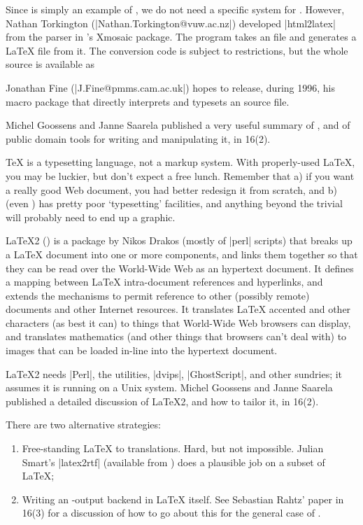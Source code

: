 Since  is simply an example of , we do not need a specific
system for .  However, Nathan Torkington
(\Email|Nathan.Torkington@vuw.ac.nz|) developed
\ProgName|html2latex| from the  parser in 's
Xmosaic package.
The program takes an  file and generates a \LaTeX{} file from it.
The conversion code is subject to  restrictions, but the whole
source is available as 

Jonathan Fine (\Email|J.Fine@pmms.cam.ac.uk|) hopes to release, during
1996, his macro package that directly interprets and typesets an
 source file.

Michel Goossens and Janne Saarela published a very useful summary of
, and of public domain tools for writing and manipulating it, in
\TUGboat{} 16(2).


\TeX{} is a typesetting language, not a markup system.
With properly-used \LaTeX{}, you may  be luckier, 
but don't expect a free lunch. Remember that a) if you want a really
good Web document, you had better redesign it from scratch, and b)  
(even ) has pretty poor `typesetting' facilities, and anything
beyond the trivial will probably need to end up a graphic.

\LaTeX{}2 () is a package by Nikos Drakos
(mostly of \ProgName|perl| scripts) that breaks up a \LaTeX{} document
into one or more components, and links them together so that they can
be read over the World-Wide Web as an hypertext document.
It defines a mapping between \LaTeX{} intra-document
references and hyperlinks, and extends the
mechanisms to permit reference to other (possibly remote) documents
and other Internet resources.  It translates \LaTeX{} accented and
other characters (as best it can) to things that World-Wide Web
browsers can display, and translates mathematics
(and other things that browsers can't deal with) to
images that can be loaded in-line into the hypertext document.

\LaTeX{}2 needs \ProgName|Perl|, the  utilities,
\ProgName|dvips|, \ProgName|GhostScript|, and other sundries; it
assumes it is running on a Unix system.
Michel Goossens and Janne Saarela published a detailed discussion of
\LaTeX{}2, and how to tailor it, in \TUGboat{} 16(2).

There are two alternative strategies:
\begin{enumerate}
\item Free-standing \LaTeX{} to  translations. Hard, but
  not impossible.  Julian Smart's \ProgName|latex2rtf| (available from
  ) does a plausible job on a subset of \LaTeX{};
\item Writing an -output backend in \LaTeX{} itself.  See
  Sebastian Rahtz' paper in \TUGboat{} 16(3) for a discussion of how
  to go about this for the general case of .
\end{enumerate}


